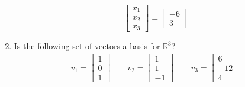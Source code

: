 \documentclass[10pt, a4paper]{article}
\theoremstyle{break}
\begin{document}
\begin{enumerate}
$$\begin{bmatrix}
x_1 \\
x_2 \\
x_3
\end{bmatrix}
=
\begin{bmatrix}
-6 \\
3
\end{bmatrix} 
$$
\item Is the following set of vectors a basis for $\mathbb{R}^3$?
\begin{align}
v_1=\begin{bmatrix} 1 \\ 0 \\1 \end{bmatrix} \qquad v_2=\begin{bmatrix} 1 \\ 1 \\ -1 \end{bmatrix} \qquad v_3=\begin{bmatrix} 6 \\ -12\\ 4 \end{bmatrix}
\end{align}
\end{enumerate}
\end{document}
